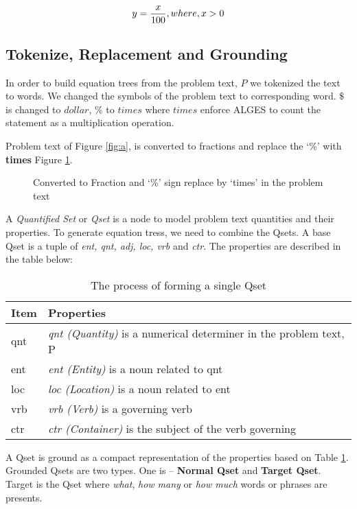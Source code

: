 \documentclass[document.tex]{subfiles}
\begin{document}
\begin{equation}
	y = {x \over 100}, where, x>0
	\label{eq:conv}
\end{equation}

\subsection{Tokenize, Replacement and Grounding}
\noindent In order to build equation trees from the problem text, $P$ we tokenized the text to words. We changed the symbols of the problem text to corresponding word. $\$$ is changed to $dollar$, $\%$ to $times$ where $times$ enforce ALGES to count the statement as a multiplication operation.

Problem text of Figure \ref{fig:a}, is converted to fractions and replace the ‘\%’ with \textbf{times} Figure \ref{fig:conv}.
\begin{figure}[H]
	
	\caption{Converted to Fraction and ‘\%’ sign replace by ‘times’ in the problem text}
	\label{fig:conv}
\end{figure}

A \textit{Quantified Set} or \textit{Qset} is a node to model problem text quantities and their properties. To generate equation tress, we need to combine the Qsets. A base Qset is a tuple of \textit{ent, qnt, adj, loc, vrb} and \textit{ctr}. The properties are described in the table below:
\begin{table}[H]
	\caption{The process of forming a single Qset\cite{3}}
	\begin{center}
		\begin{tabular}{|l|l|}\hline
			Item & Properties          \\ \hline
			qnt  & \textit{qnt (Quantity)} is a numerical determiner in the problem text, P \\ \hline
			
			ent  & \textit{ent (Entity)} is a noun related to qnt \\ \hline
			loc  & \textit{loc (Location)} is a noun related to ent \\ \hline
			vrb  & \textit{vrb (Verb)} is a governing verb \\ \hline
			ctr  & \textit{ctr (Container)} is the subject of the verb governing \\ \hline
		\end{tabular}
	\end{center}
	\label{tab:qset}
\end{table}
A Qset is ground as a compact representation of the properties based on Table \ref{tab:qset}. Grounded Qsets are two types. One is – \textbf{Normal Qset} and \textbf{Target Qset}. Target is the Qset where \textit{what}, \textit{how many} or \textit{how much} words or phrases are presents.
\end{document}
